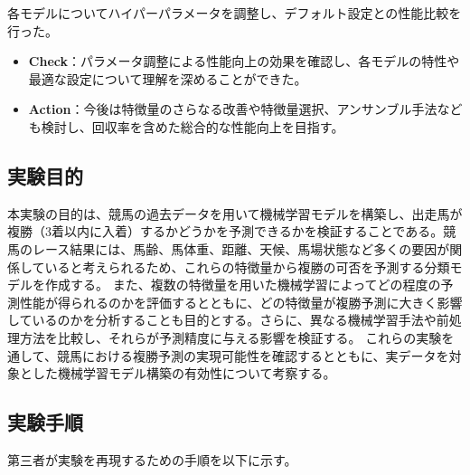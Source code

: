 \documentclass[dvipdfmx, a4paper, 11pt, titlepage]{jsarticle}
\begin{document}
各モデルについてハイパーパラメータを調整し、デフォルト設定との性能比較を行った。

\begin{itemize}
    \item \textbf{Check}：パラメータ調整による性能向上の効果を確認し、各モデルの特性や最適な設定について理解を深めることができた。
    \item \textbf{Action}：今後は特徴量のさらなる改善や特徴量選択、アンサンブル手法なども検討し、回収率を含めた総合的な性能向上を目指す。
\end{itemize}

\subsection{実験目的}
本実験の目的は、競馬の過去データを用いて機械学習モデルを構築し、出走馬が複勝（3着以内に入着）するかどうかを予測できるかを検証することである。競馬のレース結果には、馬齢、馬体重、距離、天候、馬場状態など多くの要因が関係していると考えられるため、これらの特徴量から複勝の可否を予測する分類モデルを作成する。
また、複数の特徴量を用いた機械学習によってどの程度の予測性能が得られるのかを評価するとともに、どの特徴量が複勝予測に大きく影響しているのかを分析することも目的とする。さらに、異なる機械学習手法や前処理方法を比較し、それらが予測精度に与える影響を検証する。
これらの実験を通して、競馬における複勝予測の実現可能性を確認するとともに、実データを対象とした機械学習モデル構築の有効性について考察する。

\subsection{実験手順}

第三者が実験を再現するための手順を以下に示す。
\end{document}
